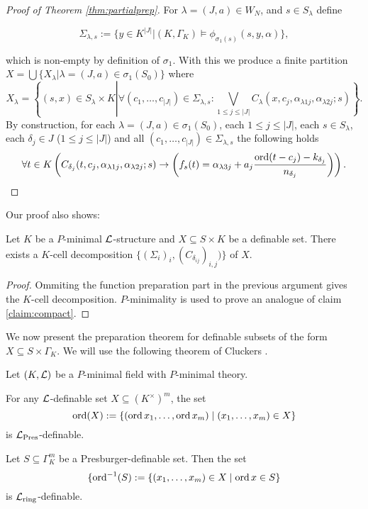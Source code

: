\begin{proof}[Proof of Theorem \ref{thm:partialprep}]
For $\lambda=(J,a)\in W_N$, and $s\in S_\lambda$ define 

\[\Sigma_{\lambda,s}:= \{y\in K^{|J|}|(K,\Gamma_K)\models\phi_{\sigma_1(s)}(s,y,\alpha)\},\]

which is non-empty by definition of $\sigma_1$. With this we produce a finite partition $X=\bigcup\{X_\lambda|\lambda=(J,a)\in \sigma_1(S_0)\}$ where 
\small
\[X_\lambda =\left\{(s,x)\in S_{\lambda}\times K\left|\forall (c_1,\ldots,c_{|J|})\in \Sigma_{\lambda,s}:\bigvee_{1\leq j\leq |J|}C_{\lambda}(x,c_j,\alpha_{\lambda 1j},\alpha_{\lambda 2j};s)\right\}\right..
\]
\normalsize
By construction, for each $\lambda=(J,a)\in \sigma_1(S_0)$, each $1\leq j\leq |J|$, each $s\in S_\lambda$, each $\delta_j\in J$ ($1\leq j\leq|J|$) and all $(c_1,\ldots,c_{|J|})\in \Sigma_{\lambda,s}$ the following holds \small
\[\forall t\in K \left(C_{\delta_j}(t,c_j,\alpha_{\lambda 1j},\alpha_{\lambda 2j};s) \rightarrow \left(f_s(t)=\alpha_{\lambda 3j}+a_j\frac{\operatorname{ord}(t-c_j)-k_{\delta_j}}{n_{\delta_j}}\right)\right).
\]
\normalsize
 
\end{proof}

Our proof also shows: 

\begin{thm}
Let $K$ be a $P$-minimal $\mathcal{L}$-structure and $X \subseteq S \times K$ be a definable set. There exists a $K$-cell decomposition $\{(\Sigma_i)_{i}, (C_{\delta_{ij}})_{i,j})\}$ of $X$.
\end{thm}
\begin{proof} Ommiting the function preparation part in the previous argument gives the $K$-cell decomposition. $P$-minimality is used to prove an analogue of claim \ref{claim:compact}. 
\end{proof}

We now present the preparation theorem for definable subsets of the form $X\subseteq S\times \Gamma_K$. We will use the following theorem of Cluckers \cite{clu-presb03}.
\begin{thm}\label{thm:semialgpres}
Let $(K, \mathcal{L})$ be a $P$-minimal field with $P$-minimal theory. 
\item For any $\mathcal{L}$-definable set $X \subseteq (K^{\times})^m$, the set
\[\operatorname{ord}(X):=\{(\operatorname{ord} x_1, \ldots, \operatorname{ord} x_m) \mid (x_1, \ldots, x_m) \in X\}\]
is $\mathcal{L}_{\text{Pres}}$-definable.
\item Let $S \subseteq \Gamma_K^m$ be a Presburger-definable set. Then the set
\[\{\operatorname{ord}^{-1}(S):= \{ (x_1, \ldots, x_m) \in X \mid \operatorname{ord} x \in S\}\]
is $\mathcal{L}_{\text{ring}}$-definable.
\end{thm}

